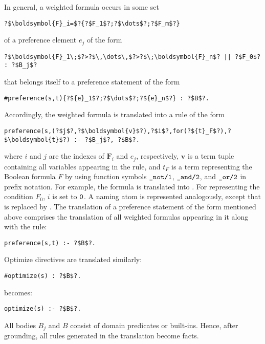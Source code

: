 In general, a weighted formula 
occurs in some set
\begin{lstlisting}[numbers=none,escapechar=?]
?$\boldsymbol{F}_i=$?{?$F_1$?;?$\dots$?;?$F_m$?}
\end{lstlisting}
of a preference element $e_j$ of the form 
\begin{lstlisting}[numbers=none,escapechar=?]
?$\boldsymbol{F}_1\;$?>?$\,\dots\,$?>?$\;\boldsymbol{F}_n$? || ?$F_0$? : ?$B_j$?
\end{lstlisting}
that belongs itself to a preference statement  of the form
\begin{lstlisting}[numbers=none,escapechar=?]
#preference(s,t){?${e}_1$?;?$\dots$?;?${e}_n$?} : ?$B$?.
\end{lstlisting}
Accordingly, the weighted formula is translated into a rule of the form
\begin{lstlisting}[numbers=none,escapechar=?]
preference(s,(?$j$?,?$\boldsymbol{v}$?),?$i$?,for(?${t}_F$?),?$\boldsymbol{t}$?) :- ?$B_j$?, ?$B$?.
\end{lstlisting}
where $i$ and $j$ are the indexes of $\boldsymbol{F}_i$ and $e_j$, respectively, 
$\boldsymbol{v}$ is a term tuple containing all variables appearing in the rule, 
and ${t}_F$ is a term representing the Boolean formula $F$ 
by using function symbols $\texttt{\_not/1}$, $\texttt{\_and/2}$, and $\texttt{\_or/2}$ in prefix notation.
For example, 
the formula  is translated into . 
%
For representing the condition $F_0$, $i$ is set to $\texttt{0}$.
%
A naming atom  is represented analogously,
except that  is replaced by .
%
The translation of a preference statement of the form mentioned above 
comprises the translation of all weighted formulas appearing in it
along with the rule:
\begin{lstlisting}[numbers=none,escapechar=?]
preference(s,t) :- ?$B$?.
\end{lstlisting}
Optimize directives are translated similarly:
\begin{lstlisting}[numbers=none,escapechar=?]
#optimize(s) : ?$B$?.
\end{lstlisting}
becomes:
\begin{lstlisting}[numbers=none,escapechar=?]
optimize(s) :- ?$B$?.
\end{lstlisting}

\begin{note}
All bodies $B_j$ and $B$ consist of domain predicates or built-ins. 
Hence, after grounding, all rules generated in the translation become facts.
\end{note}

